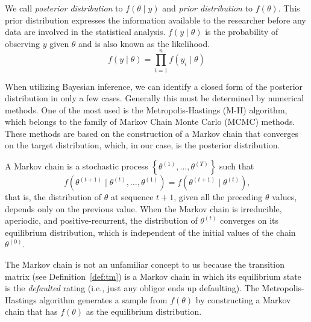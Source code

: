 \documentclass[11pt,fleqn]{book} %
\begin{document}
We call \emph{posterior distribution} to $f(\theta \mid y)$ and 
\emph{prior distribution} to $f(\theta)$. This prior distribution 
expresses the information available to the researcher before 
any data are involved in the statistical analysis. $f(y \mid \theta)$ 
is the probability of observing $y$ given $\theta$ and is also 
known as the likelihood.
\begin{displaymath}
	f(y \mid \theta) = \prod_{i=1}^n f(y_i \mid \theta)
\end{displaymath}

When utilizing Bayesian inference, we can identify a closed form of the 
posterior distribution in only a few cases. Generally this must be determined 
by numerical methods. One of the most used is the Metropolis-Hastings (M-H)
algorithm, which belongs to the family of Markov Chain Monte Carlo (MCMC) 
methods. These methods are based on the construction of a Markov chain that 
converges on the target distribution, which, in our case, is the posterior 
distribution.

\begin{definition}
	A Markov chain is a stochastic process 
	$\left\{\theta^{(1)},\dots,\theta^{(T)}\right\}$ such that
	\begin{displaymath}
		f\left(\theta^{(t+1)} \mid \theta^{(t)},\dots,\theta^{(1)}\right) = 
		f\left(\theta^{(t+1)} \mid \theta^{(t)}\right)
		\text{,}
	\end{displaymath}
	that is, the distribution of $\theta$ at sequence $t+1$, given all the 
	preceding $\theta$ values, depends only on the previous value. 
	When the Markov chain is irreducible, aperiodic, and positive-recurrent, 
	the distribution of $\theta^{(t)}$ converges on its equilibrium 
	distribution, which is independent of the initial values of the chain 
	$\theta^{(0)}$.
\end{definition}

The Markov chain is not an unfamiliar concept to us because the transition 
matrix (see Definition~\ref{def:tm}) is a Markov chain in which its 
equilibrium state is the \emph{defaulted} rating (i.e., just any 
obligor ends up defaulting).
The Metropolis-Hastings algorithm generates a sample from $f(\theta)$ 
by constructing a Markov chain that has $f(\theta)$ as the equilibrium 
distribution.
\end{document}
